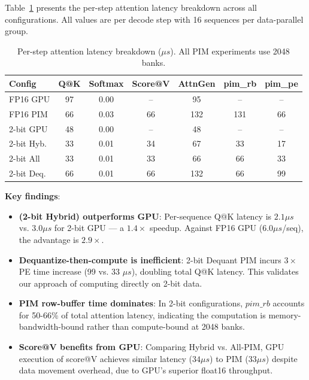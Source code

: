 Table~\ref{tab:main} presents the per-step attention latency breakdown across all configurations.
All values are per decode step with 16 sequences per data-parallel group.


\begin{table}[t]
\caption{Per-step attention latency breakdown ($\mu s$). All PIM experiments use 2048 banks.}
\label{tab:main}
\centering
\small
\begin{tabular}{lcccccc}
\toprule
\textbf{Config} & \textbf{Q@K} & \textbf{Softmax} & \textbf{Score@V} & \textbf{AttnGen} & \textbf{pim\_rb} & \textbf{pim\_pe} \\
\midrule
FP16 GPU   & 97 & 0.00 & -- & 95  & -- & -- \\
FP16 PIM   & 66 & 0.03 & 66 & 132 & 131 & 66 \\
2-bit GPU  & 48 & 0.00 & -- & 48  & -- & -- \\
2-bit Hyb. & 33 & 0.01 & 34 & 67  & 33  & 17 \\
2-bit All  & 33 & 0.01 & 33 & 66  & 66  & 33 \\
2-bit Deq. & 66 & 0.01 & 66 & 132 & 66  & 99 \\
\bottomrule
\end{tabular}
\end{table}

\textbf{Key findings}:
\begin{itemize}
\item \textbf{\pimattn{} (2-bit Hybrid) outperforms GPU}: Per-sequence Q@K latency is $2.1\mu s$ vs. $3.0\mu s$ for 2-bit GPU — a $1.4\times$ speedup. Against FP16 GPU ($6.0\mu s$/seq), the advantage is $2.9\times$.
\item \textbf{Dequantize-then-compute is inefficient}: 2-bit Dequant PIM incurs $3\times$ PE time increase (99 vs. 33 $\mu s$), doubling total Q@K latency.
This validates our approach of computing directly on 2-bit data.
\item \textbf{PIM row-buffer time dominates}: In 2-bit configurations, $pim\_rb$ accounts for 50-66\% of total attention latency, indicating the computation is memory-bandwidth-bound rather than compute-bound at 2048 banks.
\item \textbf{Score@V benefits from GPU}: Comparing Hybrid vs. All-PIM, GPU execution of score@V achieves similar latency ($34\mu s$) to PIM ($33\mu s$) despite data movement overhead, due to GPU's superior float16 throughput.
\end{itemize}

